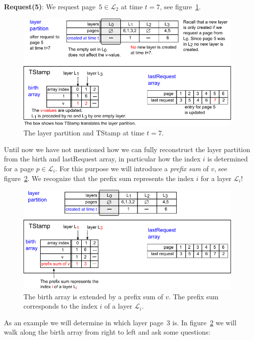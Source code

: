\documentclass[a4paper,12pt, titlepage]{article}  %
\newcommand{\cl}{\mathcal{L}}   %
\begin{document}
\noindent \textbf{Request(5)}: We request page~$5\in \cl_2$ at time $t=7$, see figure~\ref{fig:TStamp_request_t7}.
\begin{figure}[htp]
	\centering
	\includegraphics[scale=0.95]{./figures/TStamp_request_t7.pdf}
	\caption{The layer partition and TStamp at time $t=7$.} 
	\label{fig:TStamp_request_t7}
\end{figure}

\noindent Until now we have not mentioned how we can fully reconstruct the layer partition from the
birth and lastRequest array, in particular how the index $i$ is determined for a page $p \in \cl_i$.
For this purpose we will introduce a \emph{prefix sum} of $v$, see figure~\ref{fig:TStamp_prefixSum}.
We recognize that the prefix sum represents the index $i$ for a layer $\cl_i$! 
\begin{figure}[htp]
	\centering
	\includegraphics[scale=1.0]{./figures/TStamp_prefixSum.pdf}
	\caption{The birth array is extended by a prefix sum of $v$. The prefix sum corresponds to the index $i$ of a layer $\cl_i$.} 
	\label{fig:TStamp_prefixSum}
\end{figure}
As an example we will determine in which
layer page~3 is. In figure~\ref{fig:TStamp_prefixSum} we will walk along the birth array from right to left and ask some questions:
\end{document}

